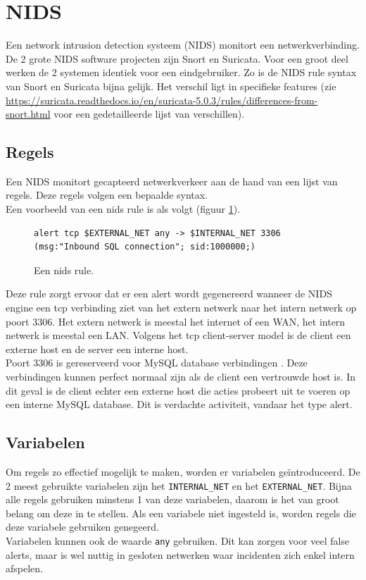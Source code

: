 \documentclass[a4paper,12pt]{report}
\begin{document}
\section{NIDS}
Een network intrusion detection systeem (NIDS) monitort een netwerkverbinding.
\\
De 2 grote NIDS software projecten zijn Snort en Suricata.
Voor een groot deel werken de 2 systemen identiek voor een eindgebruiker.
Zo is de NIDS rule syntax van Snort en Suricata bijna gelijk.
Het verschil ligt in specifieke features (zie \url{https://suricata.readthedocs.io/en/suricata-5.0.3/rules/differences-from-snort.html} voor een gedetailleerde lijst van verschillen).

\subsection{Regels}
Een NIDS monitort gecapteerd netwerkverkeer aan de hand van een lijst van regels.
Deze regels volgen een bepaalde syntax.
\\
Een voorbeeld van een nids rule is als volgt (figuur \ref{fig:nids-rule}).
\begin{figure}[h]
  \begin{lstlisting}
alert tcp $EXTERNAL_NET any -> $INTERNAL_NET 3306 (msg:"Inbound SQL connection"; sid:1000000;)
  \end{lstlisting}
  \caption{Een nids rule.}
  \label{fig:nids-rule}
\end{figure}
Deze rule zorgt ervoor dat er een alert wordt gegenereerd wanneer de NIDS engine een tcp verbinding ziet van het extern netwerk naar het intern netwerk op poort 3306.
Het extern netwerk is meestal het internet of een WAN, het intern netwerk is meestal een LAN.
Volgens het tcp client-server model is de client een externe host en de server een interne host.
\\
Poort 3306 is gereserveerd voor MySQL database verbindingen \autocite{iana:ports}.
Deze verbindingen kunnen perfect normaal zijn als de client een vertrouwde host is.
In dit geval is de client echter een externe host die acties probeert uit te voeren op een interne MySQL database.
Dit is verdachte activiteit, vandaar het type alert.

\subsection{Variabelen}
Om regels zo effectief mogelijk te maken, worden er variabelen geïntroduceerd.
De 2 meest gebruikte variabelen zijn het \verb!INTERNAL_NET! en het \verb!EXTERNAL_NET!.
Bijna alle regels gebruiken minstens 1 van deze variabelen, daarom is het van groot belang om deze in te stellen.
Als een variabele niet ingesteld is, worden regels die deze variabele gebruiken genegeerd.
\\
Variabelen kunnen ook de waarde \verb!any! gebruiken.
Dit kan zorgen voor veel false alerts, maar is wel nuttig in gesloten netwerken waar incidenten zich enkel intern afspelen.
\end{document}

